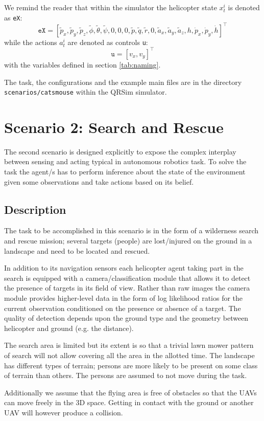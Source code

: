 \documentclass[a4paper,11pt]{report}
\newcommand{\sname}{QRSim\xspace}
\newcommand\mytexttt[1]{\texttt{\hyphenchar\font=45\relax #1}}
\begin{document}
We remind the reader that within the simulator the helicopter state $x^i_t$ is denoted as \texttt{eX}:
$$\texttt{eX} = [\tilde{p}_x,\tilde{p}_y,\tilde{p}_z,\tilde{\phi},\tilde{\theta},\tilde{\psi},0,0,0,\tilde{p},\tilde{q},\tilde{r},0,\tilde{a}_x,\tilde{a}_y,\tilde{a}_z,h,\dot{p}_x,\dot{p}_y,\dot{h}]^\intercal$$
while the actions $a^i_t$ are denoted as controls \texttt{u}:
$$\texttt{u}=[v_x,v_y]^\intercal$$
with the variables defined in section \ref{tab:naming}.

The task, the configurations and the example main files are in the directory \mytexttt{scenarios/catsmouse} within the \sname simulator. 

\newpage
\section{Scenario 2: Search and Rescue}
The second scenario is designed explicitly to expose the complex interplay between sensing and acting typical in autonomous robotics task. To solve the task the agent/s has to perform inference about the state of the environment given some observations and take actions based on its belief. 

\subsection{Description}
The task to be accomplished in this scenario is in the form of a wilderness search and rescue mission; several targets (people) are lost/injured on the ground in a landscape and need to be located and rescued. 

In addition to its navigation sensors each helicopter agent taking part in the search 
is equipped with a camera/classification module that allows it to detect the presence of targets in its field of view. Rather than raw images the camera module provides higher-level data in the form of log likelihood ratios for the current observation conditioned on the presence or absence of a target. The quality of detection depends upon the ground type and the geometry between helicopter and ground (e.g. the distance).  

The search area is limited but its extent is so that a trivial lawn mower pattern of search will not allow covering all the area in the allotted time. The landscape has different types of terrain; persons are more likely to be present on some class of terrain than others. The persons are assumed to not move during the task. 

Additionally we assume that the flying area is free of obstacles so that the UAVs can move freely in the 3D space. Getting in contact with the ground or another UAV will however produce a collision.
\end{document}
